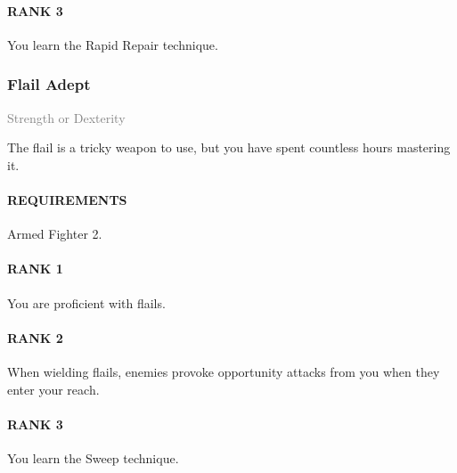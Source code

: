 \paragraph{RANK 3} You learn the Rapid Repair technique.

\subsubsection{Flail Adept} \label{tal::flailadept}
\small{\textcolor{gray}{Strength or Dexterity}}

\normalsize
The flail is a tricky weapon to use, but you have spent countless hours mastering it.
\paragraph{REQUIREMENTS} Armed Fighter 2.
\paragraph{RANK 1} You are proficient with flails.
\paragraph{RANK 2} When wielding flails, enemies provoke opportunity attacks from you when they enter your reach.
\paragraph{RANK 3} You learn the Sweep technique.

